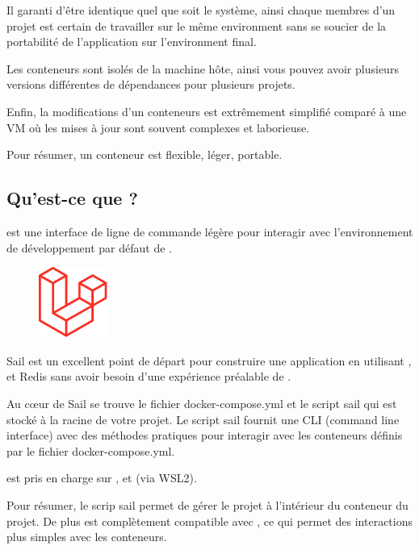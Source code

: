     Il garanti d'être identique quel que soit le système, ainsi chaque membres d'un projet est certain de travailler sur le même environment sans se soucier de la portabilité de l'application sur l'environment final.
    
    Les conteneurs sont isolés de la machine hôte, ainsi vous pouvez avoir plusieurs versions différentes de dépendances pour plusieurs projets.

    Enfin, la modifications d'un conteneurs est extrêmement simplifié comparé à une VM où les mises à jour sont souvent complexes et laborieuse.

    Pour résumer, un conteneur \docker{} est flexible, léger, portable.

\subsection[Qu'est-ce que Laravel Sail?]{Qu'est-ce que \laravelsail{}?}
    
    \laravelsail{} est une interface de ligne de commande légère pour interagir avec l'environnement de développement \docker{} par défaut de \laravel{}. 
    
    \begin{figure}
        \centering
        \includegraphics[width=0.2\textwidth]{Images_formation/LaravelLogo.pdf}
    \end{figure}
    
    Sail est un excellent point de départ pour construire une application \laravel{} en utilisant \php{}, \mysql{} et Redis sans avoir besoin d'une expérience préalable de \docker{}.

    Au cœur de Sail se trouve le fichier docker-compose.yml et le script sail qui est stocké à la racine de votre projet. Le script sail fournit une CLI (command line interface) avec des méthodes pratiques pour interagir avec les conteneurs \docker{} définis par le fichier docker-compose.yml.

    \laravelsail{} est pris en charge sur \macos{}, \linux{} et \windows{} (via WSL2).

    Pour résumer, le scrip sail permet de gérer le projet \laravel{} à l'intérieur du conteneur du projet. De plus \laravelsail{} est complètement compatible avec \docker{}, ce qui permet des interactions plus simples avec les conteneurs.
